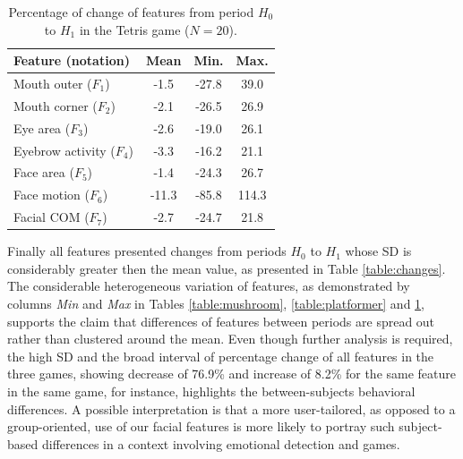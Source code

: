 \begin{table}
    \caption{Percentage of change of features from period $H_0$ to $H_1$ in the Tetris game ($N=20$).}
    \label{table:tetris}
    \centering
    \begin{threeparttable}
        \begin{tabular}{lccc}
            \toprule%
                \textbf{Feature (notation)} & \textbf{Mean} & \textbf{Min.} & \textbf{Max.} \\
            \midrule%
                Mouth outer ($F_1$)      & -1.5  & -27.8 & 39.0  \\
                Mouth corner ($F_2$)     & -2.1  & -26.5 & 26.9  \\
                Eye area ($F_3$)         & -2.6  & -19.0 & 26.1  \\
                Eyebrow activity ($F_4$) & -3.3  & -16.2 & 21.1  \\
                Face area ($F_5$)        & -1.4  & -24.3 & 26.7  \\
                Face motion ($F_6$)      & -11.3 & -85.8 & 114.3 \\
                Facial COM ($F_7$)       & -2.7  & -24.7 & 21.8  \\
            \bottomrule%
        \end{tabular}
        \begin{tablenotes}
          \small
          \item[]{}
        \end{tablenotes}
    \end{threeparttable}
\end{table}

Finally all features presented changes from periods $H_0$ to $H_1$ whose SD is considerably greater then the mean value, as presented in Table \ref{table:changes}. The considerable heterogeneous variation of features, as demonstrated by columns \textit{Min} and \textit{Max} in Tables \ref{table:mushroom}, \ref{table:platformer} and \ref{table:tetris}, supports the claim that differences of features between periods are spread out rather than clustered around the mean. Even though further analysis is required, the high SD and the broad interval of percentage change of all features in the three games, showing decrease of 76.9\% and increase of 8.2\% for the same feature in the same game, for instance, highlights the between-subjects behavioral differences. A possible interpretation is that a more user-tailored, as opposed to a group-oriented, use of our facial features is more likely to portray such subject-based differences in a context involving emotional detection and games.

